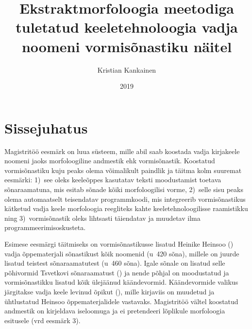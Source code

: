 \documentclass[12pt,a4paper]{article}
\begin{document}
\title{Ekstraktmorfoloogia meetodiga tuletatud keeletehnoloogia vadja noomeni vormisõnastiku näitel}
\author{Kristian Kankainen}
\date{2019}
\maketitle


\newpage
\tableofcontents




\newpage
{}
\section{Sissejuhatus}
\label{sissejuhatus}


Magistritöö eesmärk on luua süsteem, mille abil saab koostada vadja kirja\-keele noomeni jaoks morfoloogiline andmestik ehk vormisõnastik. Koostatud vormisõnastiku kuju peaks olema võimalikult paindlik ja täitma kolm suuremat eesmärki: 1)~see oleks keeleõppes kasutatav teksti moodustamist toetava sõnaraamatuna, mis esitab sõnade kõiki morfoloogilisi vorme, 2)~selle sisu peaks olema automaatselt teisendatav programm\-koodi, mis integreerib vormisõnastikus kätketud vadja keele morfoloogia reegliteks kahte keele\-tehnoloogilisse raamistikku ning 3)~vormisõnastik oleks lihtsasti täiendatav ja muudetav ilma programmeerimis\-oskusteta.

Esimese eesmärgi täitmiseks on vormi\-sõnastikusse lisatud Heinike Heinsoo (\citeyear{heinsoo_vadsonakopittoja_2015}) vadja õppematerjali sõnastikust kõik noomenid (u~420 sõna), millele on juurde lisatud teistest sõnaraamatutest (u~460 sõna). Igale sõnale on lisatud selle põhivormid Tsvetkovi sõnaraamatust (\cite{laakso_vatjan_1989}) ja nende põhjal on moodustatud ja vormi\-sõnastikku lisatud kõik ülejäänud käändevormid. Käände\-vormide valikus järgitakse vadja keele levinud õpikut (\cite{konkova_vaddceeli_2014}), mille kirja\-viis on muudetud ja ühtlustatud Heinsoo õppematerjalidele vastavaks. Magistritöö vältel koostatud andmestik on kirjeldava iseloomuga ja ei pretendeeri lõplikule morfoloogia esitusele (vrd eesmärk 3).
\end{document}
